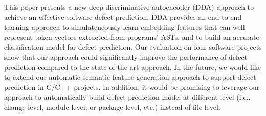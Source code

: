 
This paper presents a new deep  discriminative autoencoder (DDA) approach to achieve an effective software defect prediction. DDA provides an end-to-end learning approach to simulateneously learn embedding features that can well represent token vectors extracted from programs' ASTs, and to build an accurate classification model for defect prediction. Our evaluation on four software projects show that our approach could significantly improve the performance of defect prediction compared to the state-of-the-art approach. In the future, we would like to extend our automatic semantic feature generation approach to support defect prediction in C/C++ projects. In addition, it would be promising to leverage our approach to automatically build defect prediction model at different level (i.e., change level, module level, or package level, etc.) instead of file level. 

%
